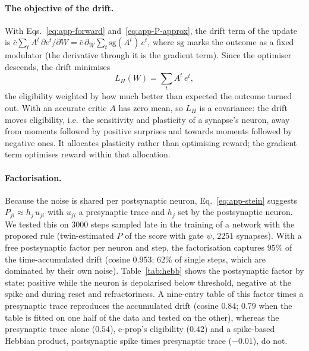 \documentclass[10pt,twocolumn]{article}
\begin{document}
\paragraph{The objective of the drift.}
With Eqs.~\eqref{eq:app-forward} and~\eqref{eq:app-P-approx}, the drift term of
the update is
$\bar c\sum_tA^t\,\partial e^t/\partial W=\bar c\,\partial_W\sum_t
\mathrm{sg}(A^t)\,e^t$, where $\mathrm{sg}$ marks the outcome as a fixed
modulator (the derivative through it is the gradient term). Since the optimiser
descends, the drift minimises
\begin{equation}
L_H(W)=\sum_t A^t\,e^t ,
\label{eq:app-LH}
\end{equation}
the eligibility weighted by how much better than expected the outcome turned
out. With an accurate critic $A$ has zero mean, so $L_H$ is a covariance: the
drift moves eligibility, i.e.\ the sensitivity and plasticity of a synapse's
neuron, away from moments followed by positive surprises and towards moments
followed by negative ones. It allocates plasticity rather than optimising reward;
the gradient term optimises reward within that allocation.

\paragraph{Factorisation.}
Because the noise is shared per postsynaptic neuron,
Eq.~\eqref{eq:app-stein} suggests $P_{ji}\approx h_j\,u_{ji}$ with $u_{ji}$ a
presynaptic trace and $h_j$ set by the postsynaptic neuron. We tested this on
$3000$ steps sampled late in the training of a network with the proposed rule
(twin-estimated $P$ of the score with gate $\psi$, $2251$ synapses). With a free
postsynaptic factor per neuron and step, the factorisation captures $95\%$ of the
time-accumulated drift (cosine $0.953$; $62\%$ of single steps, which are dominated
by their own noise). Table~\ref{tab:hebb} shows the postsynaptic factor
by state: positive while the neuron is depolarised below threshold, negative at
the spike and during reset and refractoriness. A nine-entry table of this factor
times a presynaptic trace reproduces the accumulated drift (cosine $0.84$; $0.79$
when the table is fitted on one half of the data and tested on the other),
whereas the presynaptic trace alone ($0.54$), e-prop's eligibility ($0.42$) and a
spike-based Hebbian product, postsynaptic spike times presynaptic trace
($-0.01$), do not.
\end{document}
